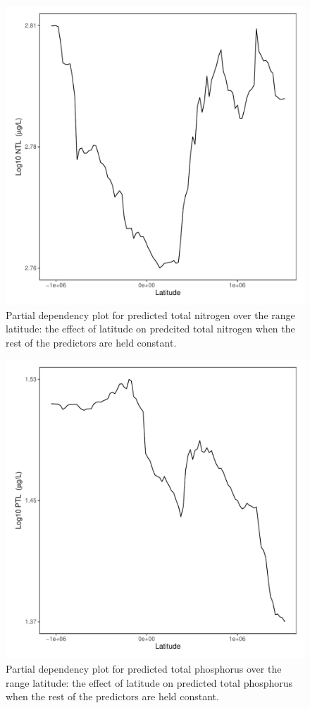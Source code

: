 \documentclass[fleqn,10pt,lineno]{wlpeerj} %
\begin{document}
\begin{figure}
  \includegraphics[scale=0.5]{PD_gisvs_N_Latitude.pdf}
  \caption{Partial dependency plot for predicted total nitrogen over the range latitude: the effect of latitude on predcited total nitrogen when the rest of the predictors are held constant.}
  \label{fig:PD_gisvs_N_Latitude}
\end{figure}

\begin{figure}
  \includegraphics[scale=0.5]{PD_gisvs_P_Latitude.pdf}
  \caption{Partial dependency plot for predicted total phosphorus over the range latitude: the effect of latitude on predicted total phosphorus when the rest of the predictors are held constant.}
  \label{fig:PD_gisvs_P_Latitude}
\end{figure}
\end{document}
